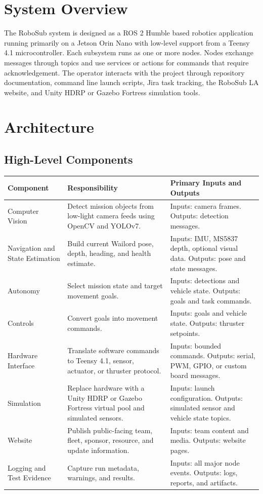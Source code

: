 \documentclass[12pt]{article}
\begin{document}
\section{System Overview}
The RoboSub system is designed as a ROS 2 Humble based robotics application running primarily on a Jetson Orin Nano with low-level support from a Teensy 4.1 microcontroller. Each subsystem runs as one or more nodes. Nodes exchange messages through topics and use services or actions for commands that require acknowledgement. The operator interacts with the project through repository documentation, command line launch scripts, Jira task tracking, the RoboSub LA website, and Unity HDRP or Gazebo Fortress simulation tools.

\section{Architecture}
\subsection{High-Level Components}
\begin{longtable}{|p{}|p{}|p{}|}
\hline
\textbf{Component} & \textbf{Responsibility} & \textbf{Primary Inputs and Outputs} \\
\hline
Computer Vision & Detect mission objects from low-light camera feeds using OpenCV and YOLOv7. & Inputs: camera frames. Outputs: detection messages. \\
\hline
Navigation and State Estimation & Build current Wailord pose, depth, heading, and health estimate. & Inputs: IMU, MS5837 depth, optional visual data. Outputs: pose and state messages. \\
\hline
Autonomy & Select mission state and target movement goals. & Inputs: detections and vehicle state. Outputs: goals and task commands. \\
\hline
Controls & Convert goals into movement commands. & Inputs: goals and vehicle state. Outputs: thruster setpoints. \\
\hline
Hardware Interface & Translate software commands to Teensy 4.1, sensor, actuator, or thruster protocol. & Inputs: bounded commands. Outputs: serial, PWM, GPIO, or custom board messages. \\
\hline
Simulation & Replace hardware with a Unity HDRP or Gazebo Fortress virtual pool and simulated sensors. & Inputs: launch configuration. Outputs: simulated sensor and vehicle state topics. \\
\hline
Website & Publish public-facing team, fleet, sponsor, resource, and update information. & Inputs: team content and media. Outputs: website pages. \\
\hline
Logging and Test Evidence & Capture run metadata, warnings, and results. & Inputs: all major node events. Outputs: logs, reports, and artifacts. \\
\hline
\end{longtable}
\end{document}
